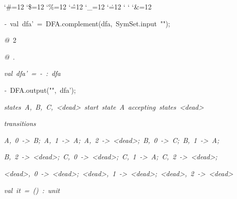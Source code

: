 \begin{list}{}
{\setlength{\leftmargin}{\leftmargini}
\setlength{\rightmargin}{0cm}
\setlength{\itemindent}{0cm}
\setlength{\listparindent}{0cm}
\setlength{\itemsep}{0cm}
\setlength{\parsep}{0cm}
\setlength{\labelsep}{0cm}
\setlength{\labelwidth}{0cm}
\catcode`\#=12
\catcode`\$=12
\catcode`\%=12
\catcode`\^=12
\catcode`\_=12
\catcode`\.=12
\catcode`
\catcode`
\catcode`\&=12
\ttfamily}
\small
\item[]\textsl{-\ }val\ dfa'\ =\ DFA.complement(dfa,\ SymSet.input\ "");
\item[]\textsl{@\ }2
\item[]\textsl{@\ }.
\item[]\textsl{val\ dfa'\ =\ -\ :\ dfa}
\item[]\textsl{-\ }DFA.output("",\ dfa');
\item[]\textsl{states\ A,\ B,\ C,\ <dead>\ start\ state\ A\ accepting\ states\ <dead>}
\item[]\textsl{transitions}
\item[]\textsl{A,\ 0\ ->\ B;\ A,\ 1\ ->\ A;\ A,\ 2\ ->\ <dead>;\ B,\ 0\ ->\ C;\ B,\ 1\ ->\ A;}
\item[]\textsl{B,\ 2\ ->\ <dead>;\ C,\ 0\ ->\ <dead>;\ C,\ 1\ ->\ A;\ C,\ 2\ ->\ <dead>;}
\item[]\textsl{<dead>,\ 0\ ->\ <dead>;\ <dead>,\ 1\ ->\ <dead>;\ <dead>,\ 2\ ->\ <dead>}
\item[]\textsl{val\ it\ =\ ()\ :\ unit}
\end{list}
